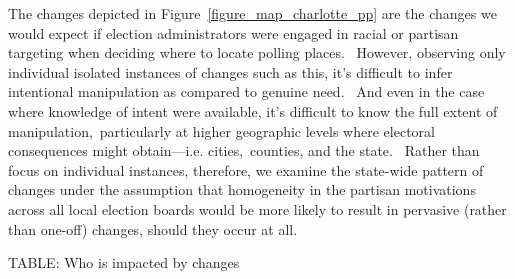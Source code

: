 \documentclass[12pt]{article}
\begin{document}
The changes depicted in Figure~\ref{figure_map_charlotte_pp} are the changes we would expect if election administrators were engaged in racial or partisan targeting when deciding where to locate polling places.  However, observing only individual isolated instances of changes such as this, it's difficult to infer intentional manipulation as compared to genuine need.  And even in the case where knowledge of intent were available, it's difficult to know the full extent of manipulation, particularly at higher geographic levels where electoral consequences might obtain---i.e. cities, counties, and the state.  Rather than focus on individual instances, therefore, we examine the state-wide pattern of changes under the assumption that homogeneity in the partisan motivations across all local election boards would be more likely to result in pervasive (rather than one-off) changes, should they occur at all.

TABLE: Who is impacted by changes
\end{document}
